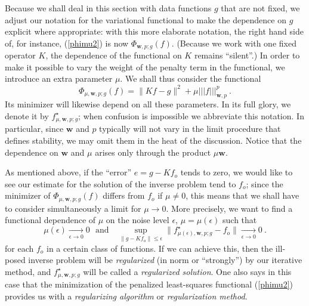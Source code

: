 \documentclass[10pt]{article}
\newcommand\eref[1]{(\ref{#1})}
\def\Vvert{\vert\!\vert\!\vert}
\begin{document}
Because we shall deal in this section with data functions $g$ that are not
fixed, we
adjust our notation for the variational functional to make the dependence
on $g$
explicit
where appropriate: with this more elaborate notation, the right hand side
of, for instance, \eref{phimu2} is now $\Phi_{\mathbf{w},p; g}(f )$.
(Because we work with one fixed
operator $K$,  the dependence of the functional on $K$ remains ``silent''.)
In order to make it possible to vary the weight of the penalty term in the
functional, we introduce an extra parameter $\mu$. We shall thus consider
the functional
\begin{equation}
\label{phimu}
\Phi_{\mu,\mathbf{w},p; g}(f)=
\| Kf-g\|^2 +\mu \Vvert f\Vvert^p_{\mathbf{w},p}~.
\end{equation}
Its minimizer will likewise depend on all these parameters. In its full
glory, we denote it by $f^{\star}_{\mu ,\mathbf{w},p;g}$; when  confusion
is impossible we  abbreviate this notation. In particular, since $\mathbf{w}$
and $p$ typically will not vary in the limit procedure that defines stability,
we may omit them in the heat of the discussion. Notice that the dependence on
$\mathbf{w}$ and $\mu$ arises only through the product $\mu \mathbf{w}$.

As mentioned above, if the ``error'' $e =g - Kf_o$ tends to zero, we would like
to see our estimate for the solution of the inverse problem tend to $f_o$;
since the minimizer of $\Phi_{\mu ,\mathbf{w},p; g}(f)$ differs from $f_o$ if
$\mu \ne 0$, this means
that we shall have to consider simultaneously a limit for $\mu \rightarrow 0$.
More precisely, we want to find a functional dependence of $\mu$
on the noise level $\epsilon$, $\mu=\mu(\epsilon)$
such that
\begin{equation}
\label{desired-res}
\mu(\epsilon)  \xrightarrow[\epsilon \rightarrow 0]{~}  0  ~~~
\mbox {and } ~~~ \sup_{\|g-Kf_o\|\leq \epsilon}
\|f^{\star}_{\mu(\epsilon) ,\mathbf{w},p;g}-f_o \|
\xrightarrow[\epsilon \rightarrow 0]{~}  0~.
\end{equation}
for each $f_o$ in a certain class of functions.
If we can achieve this, then the ill-posed inverse problem will be {\em
regularized}
(in norm or ``strongly'') by our iterative method,
and $f^\star_{\mu,\mathbf{w},p;g}$ will be
called a {\em regularized solution}.
One  also says in this case
that the minimization of the penalized least-squares functional
(\ref{phimu2}) provides us with a {\em regularizing algorithm} or
{\em regularization method}.
\end{document}
